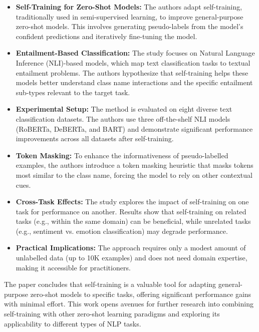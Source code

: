 \begin{itemize}
    \item \textbf{Self-Training for Zero-Shot Models:} The authors adapt self-training, traditionally used in semi-supervised learning, to improve general-purpose zero-shot models. This involves generating pseudo-labels from the model's confident predictions and iteratively fine-tuning the model.
    
    \item \textbf{Entailment-Based Classification:} The study focuses on Natural Language Inference (NLI)-based models, which map text classification tasks to textual entailment problems. The authors hypothesize that self-training helps these models better understand class name interactions and the specific entailment sub-types relevant to the target task.
    
    \item \textbf{Experimental Setup:} The method is evaluated on eight diverse text classification datasets. The authors use three off-the-shelf NLI models (RoBERTa, DeBERTa, and BART) and demonstrate significant performance improvements across all datasets after self-training.
    
    \item \textbf{Token Masking:} To enhance the informativeness of pseudo-labelled examples, the authors introduce a token masking heuristic that masks tokens most similar to the class name, forcing the model to rely on other contextual cues.
    
    \item \textbf{Cross-Task Effects:} The study explores the impact of self-training on one task for performance on another. Results show that self-training on related tasks (e.g., within the same domain) can be beneficial, while unrelated tasks (e.g., sentiment vs. emotion classification) may degrade performance.
    
    \item \textbf{Practical Implications:} The approach requires only a modest amount of unlabelled data (up to 10K examples) and does not need domain expertise, making it accessible for practitioners.
\end{itemize}


The paper concludes that self-training is a valuable tool for adapting general-purpose zero-shot models to specific tasks, offering significant performance gains with minimal effort. This work opens avenues for further research into combining self-training with other zero-shot learning paradigms and exploring its applicability to different types of NLP tasks.


